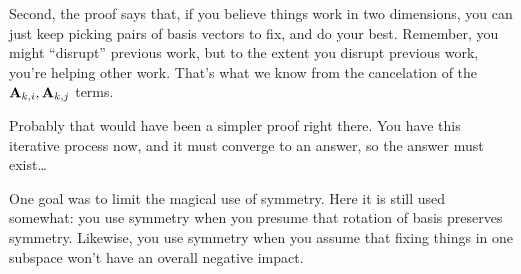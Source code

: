 Second, the proof says that, if you believe things work in two
dimensions, you can just keep picking pairs of basis vectors to fix, and
do your best. Remember, you might ``disrupt'' previous work, but to the
extent you disrupt previous work, you're helping other work. That's what
we know from the cancelation of the $\mathbf{A}_{k, i}, \mathbf{A}_{k, j}$ terms.

Probably that would have been a simpler proof right there. You have this
iterative process now, and it must converge to an answer, so the answer
must exist\dots

One goal was to limit the magical use of symmetry. Here it is still used
somewhat: you use symmetry when you presume that rotation of basis
preserves symmetry. Likewise, you use symmetry when you assume that
fixing things in one subspace won't have an overall negative impact.
